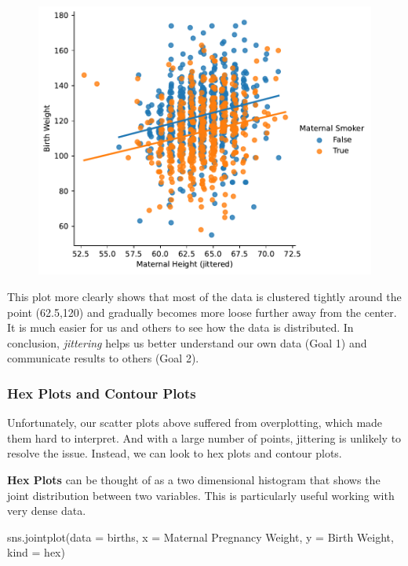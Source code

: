 \documentclass[
  letterpaper,
  DIV=11,
  numbers=noendperiod]{scrreprt}
\newenvironment{Shaded}{\begin{snugshade}}{\end{snugshade}}
\newcommand{\NormalTok}[1]{\textcolor[rgb]{0.00,0.23,0.31}{#1}}
\newcommand{\OperatorTok}[1]{\textcolor[rgb]{0.37,0.37,0.37}{#1}}
\newcommand{\StringTok}[1]{\textcolor[rgb]{0.13,0.47,0.30}{#1}}
\begin{document}
\begin{figure}[H]

{\centering \includegraphics{visualization_2/visualization_2_files/figure-pdf/cell-10-output-1.pdf}

}

\end{figure}

This plot more clearly shows that most of the data is clustered tightly
around the point (62.5,120) and gradually becomes more loose further
away from the center. It is much easier for us and others to see how the
data is distributed. In conclusion, \emph{jittering} helps us better
understand our own data (Goal 1) and communicate results to others (Goal
2).

\hypertarget{hex-plots-and-contour-plots}{%
\subsubsection{Hex Plots and Contour
Plots}\label{hex-plots-and-contour-plots}}

Unfortunately, our scatter plots above suffered from overplotting, which
made them hard to interpret. And with a large number of points,
jittering is unlikely to resolve the issue. Instead, we can look to hex
plots and contour plots.

\textbf{Hex Plots} can be thought of as a two dimensional histogram that
shows the joint distribution between two variables. This is particularly
useful working with very dense data.

\begin{Shaded}
\begin{Highlighting}[]
\NormalTok{sns.jointplot(data }\OperatorTok{=}\NormalTok{ births, x }\OperatorTok{=} \StringTok{\textquotesingle{}Maternal Pregnancy Weight\textquotesingle{}}\NormalTok{, }
\NormalTok{              y }\OperatorTok{=} \StringTok{\textquotesingle{}Birth Weight\textquotesingle{}}\NormalTok{, kind }\OperatorTok{=} \StringTok{\textquotesingle{}hex\textquotesingle{}}\NormalTok{)}
\end{Highlighting}
\end{Shaded}
\end{document}
